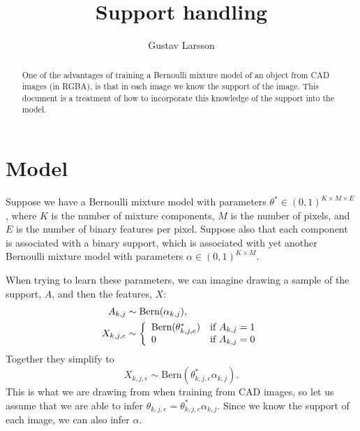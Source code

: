 \documentclass{article}
\newcommand{\Bern}[1]{\text{Bern}(#1)}
\begin{document}
\title{Support handling}

\author{Gustav Larsson}

\maketitle

\begin{abstract}
One of the advantages of training a Bernoulli mixture model of an object from CAD images (in RGBA), is that in each image we know the support of the image. This document is a treatment of how to incorporate this knowledge of the support into the model.
%
%
\end{abstract}
%


\section{Model}
Suppose we have a Bernoulli mixture model with parameters $\theta^* \in (0, 1)^{K \times M \times E}$, where $K$ is the number of mixture components, $M$ is the number of pixels, and $E$ is the number of binary features per pixel. Suppose also that each component is associated with a binary support, which is associated with yet another Bernoulli mixture model with parameters $\alpha \in (0, 1)^{K \times M}$.

When trying to learn these parameters, we can imagine drawing a sample of the support, $A$, and then the features, $X$:
\begin{align*}
    A_{k,j} & \sim \Bern{\alpha_{k,j}}, \\
    X_{k,j,e} & \sim \left\{
        \begin{array}{l l}
            \Bern{\theta^*_{k,j,e}} & \text{if }A_{k,j} = 1  \\
            0 & \text{if }A_{k,j} = 0
        \end{array} \right.
\end{align*}
Together they simplify to 
\[
    X_{k,j,e} \sim \Bern{\theta^*_{k,j,e} \alpha_{k,j}}.
\] 
This is what we are drawing from when training from CAD images, so let us assume that we are able to infer $\theta_{k,j,e} = \theta^*_{k,j,e} \alpha_{k,j}$. Since we know the support of each image, we can also infer $\alpha$.
\end{document}
